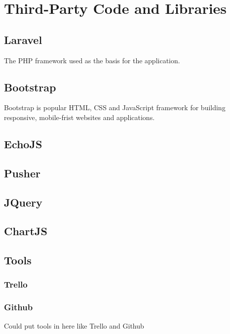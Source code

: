 \chapter{Third-Party Code and Libraries}
\section{Laravel}
The PHP framework used as the basis for the application\cite{laravel}.
\section{Bootstrap}
Bootstrap is popular HTML, CSS and JavaScript framework for building responsive, mobile-frist websites and applications\cite{bootstrap}.
\section{EchoJS}
\section{Pusher}
\section{JQuery}
\section{ChartJS}
\section{Tools}
\subsection{Trello}
\subsection{Github}
Could put tools in here like Trello and Github